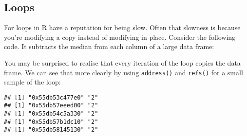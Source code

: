 \hypertarget{loops}{%
\subsection{Loops}\label{loops}}

For loops in R have a reputation for being slow. Often that slowness is
because you're modifying a copy instead of modifying in place. Consider
the following code. It subtracts the median from each column of a large
data frame: 

\begin{Shaded}
\begin{Highlighting}[]
\StringTok{ }\NormalTok{(}\NormalTok{(}\NormalTok{(} \OperatorTok{*}\StringTok{ }\NormalTok{), } \NormalTok{))}
\StringTok{ }\NormalTok{(}\NormalTok{))}

 
\StringTok{ }\OperatorTok{-}\StringTok{ }
\NormalTok{\}}
\end{Highlighting}
\end{Shaded}

You may be surprised to realise that every iteration of the loop copies
the data frame. We can see that more clearly by using \texttt{address()}
and \texttt{refs()} for a small sample of the loop:

\begin{Shaded}
\begin{Highlighting}[]
 \OperatorTok{:}\NormalTok{) \{}
\StringTok{ }\OperatorTok{-}\StringTok{ }
  \NormalTok{(}\NormalTok{(}
\NormalTok{\}}
\end{Highlighting}
\end{Shaded}

\begin{verbatim}
## [1] "0x55db53c477e0" "2"             
## [1] "0x55db57eeed00" "2"             
## [1] "0x55db54c5a330" "2"             
## [1] "0x55db57b1dc10" "2"             
## [1] "0x55db58145130" "2"
\end{verbatim}

